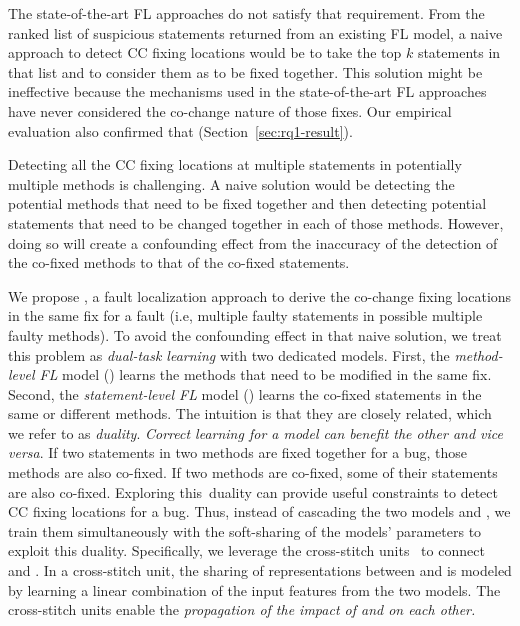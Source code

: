 The state-of-the-art FL approaches do not satisfy that requirement.
From the ranked list of suspicious statements returned from an
existing FL model, a naive approach to detect CC fixing locations would
be to take the top $k$ statements in that list and to consider them as
to be fixed together. This solution might be ineffective
because the mechanisms used in the state-of-the-art FL approaches have
never considered the co-change nature of those fixes. Our empirical
evaluation also confirmed that (Section~\ref{sec:rq1-result}).

Detecting all the CC fixing locations at multiple statements in
potentially multiple methods is challenging. A naive solution would be
detecting the potential methods that need to be fixed together and
then detecting potential statements that need to be changed together
in each of those methods. However, doing so will create a confounding
effect from the inaccuracy of the detection of the co-fixed methods to
that of the co-fixed statements.

We propose {\tool}, a fault localization approach to derive the
co-change fixing locations in the same fix for a fault (i.e, multiple
faulty statements in possible multiple faulty methods). To avoid the
confounding effect in that naive solution, we treat this problem as
{\em dual-task learning} with two dedicated models. First, the {\em
  method-level FL} model () learns the methods that need
to be modified in the same fix. Second, the {\em statement-level FL}
model () learns the co-fixed statements in the same or
different methods. The intuition is that they are closely related,
which we refer to as {\em duality}. {\em Correct learning for a model
  can benefit the other and vice versa}. If two statements in two
methods are fixed together for a bug, those methods are also
co-fixed. If two methods are co-fixed, some of their statements are
also co-fixed. Exploring this~duality can provide useful constraints
to detect CC fixing locations for a bug. Thus, instead of cascading
the two models  and , we train them
simultaneously with the soft-sharing of the models' parameters to
exploit this duality. Specifically, we leverage the cross-stitch
units~\cite{misra2016cross} to connect  and
. In a cross-stitch unit, the sharing of representations
between  and  is modeled by learning a
linear combination of the input features from the two models. The
cross-stitch units enable the {\em propagation of the impact of
   and  on each other.}

